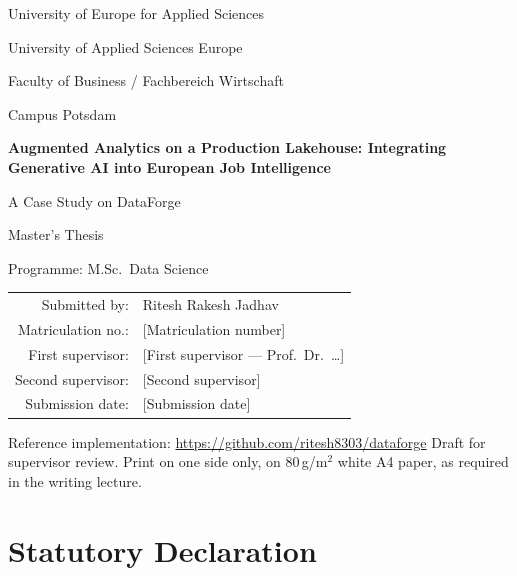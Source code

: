 \documentclass[12pt,a4paper,oneside]{report}
\newcommand{\Matrikel}{[Matriculation number]}
\newcommand{\Erstbetreuung}{[First supervisor --- Prof.\ Dr.\ \ldots]}
\newcommand{\Zweitbetreuung}{[Second supervisor]}
\newcommand{\Abgabedatum}{[Submission date]}
\newcommand{\ThesisTitle}{Augmented Analytics on a Production Lakehouse: Integrating Generative AI into European Job Intelligence}
\newcommand{\ThesisSubtitle}{A Case Study on DataForge}
\begin{document}
\begin{titlepage}
\centering
{\large University of Europe for Applied Sciences\par}
\vspace{0.3em}
{\large University of Applied Sciences Europe\par}
\vspace{0.3em}
{\large Faculty of Business / Fachbereich Wirtschaft\par}
\vspace{0.3em}
{\large Campus Potsdam\par}
\vspace{2.2em}
{\LARGE\bfseries \ThesisTitle\par}
\vspace{1em}
{\large \ThesisSubtitle\par}
\vspace{2.2em}
{\large Master's Thesis\par}
\vspace{0.4em}
{\normalsize Programme: M.Sc.\ Data Science\par}
\vspace{1.8em}
\begin{tabular}{rl}
Submitted by: & Ritesh Rakesh Jadhav \\
Matriculation no.: & \Matrikel \\
First supervisor: & \Erstbetreuung \\
Second supervisor: & \Zweitbetreuung \\
Submission date: & \Abgabedatum \\
\end{tabular}
\vspace{1.8em}
\par
Reference implementation: \url{https://github.com/ritesh8303/dataforge}
\vfill
{\small Draft for supervisor review. Print on one side only, on 80\,g/m$^2$ white A4 paper, as required in the writing lecture.}
\end{titlepage}

\clearpage
\thispagestyle{empty}
\section*{Statutory Declaration}
\end{document}
